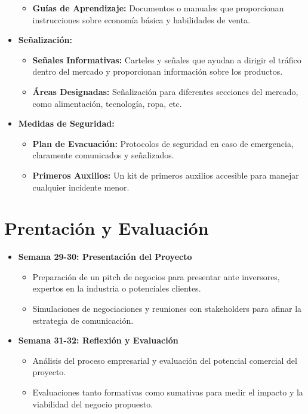 \begin{itemize}
\begin{itemize}
                \item \textbf{Guías de Aprendizaje:} Documentos o manuales que proporcionan instrucciones sobre economía básica y habilidades de venta.
            \end{itemize}
    \item \textbf{Señalización:}
            \begin{itemize}
                \item \textbf{Señales Informativas:} Carteles y señales que ayudan a dirigir el tráfico dentro del mercado y proporcionan información sobre los productos.
                \item \textbf{Áreas Designadas:} Señalización para diferentes secciones del mercado, como alimentación, tecnología, ropa, etc.
            \end{itemize}
    \item \textbf{Medidas de Seguridad:}
            \begin{itemize}
                \item \textbf{Plan de Evacuación:} Protocolos de seguridad en caso de emergencia, claramente comunicados y señalizados.
                \item \textbf{Primeros Auxilios:} Un kit de primeros auxilios accesible para manejar cualquier incidente menor.
            \end{itemize}
\end{itemize}





\newpage
\section{Prentación y Evaluación}
\begin{itemize}
  \item \textbf{Semana 29-30: Presentación del Proyecto}
  \begin{itemize}
    \item Preparación de un pitch de negocios para presentar ante inversores, expertos en la industria o potenciales clientes.
    \item Simulaciones de negociaciones y reuniones con stakeholders para afinar la estrategia de comunicación.
  \end{itemize}
  \item \textbf{Semana 31-32: Reflexión y Evaluación}
  \begin{itemize}
    \item Análisis del proceso empresarial y evaluación del potencial comercial del proyecto.
    \item Evaluaciones tanto formativas como sumativas para medir el impacto y la viabilidad del negocio propuesto.
  \end{itemize}
\end{itemize}

